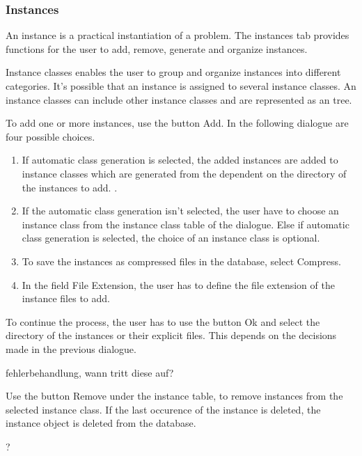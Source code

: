 \subsubsection{Instances}
 An instance is a practical instantiation of a problem. The instances tab provides functions for the user to add, remove, generate and organize instances.

 Instance classes enables the user to group and organize instances into different categories. It's possible that an instance is assigned to several instance classes. An instance classes can include other instance classes and are represented as an tree.

 To add one or more instances, use the button Add. In the following dialogue are four possible choices. 
\begin{enumerate}
	\item If automatic class generation is selected, the added instances are added to instance classes which
	are generated from the dependent on the directory of the instances to add. .
	
	\item If the automatic class generation isn't selected, the user have to choose an instance class from the 		instance class table of the dialogue. Else if automatic class generation is selected, the choice of an 			instance class is optional.
	
	\item To save the instances as compressed files in the database, select Compress.
	
	\item In the field File Extension, the user has to define the file extension of the instance files to add.
\end{enumerate}

To continue the process, the user has to use the button Ok and select the directory of the instances or their explicit files. This depends on the decisions made in the previous dialogue.

fehlerbehandlung, wann tritt diese auf?
 

 Use the button Remove under the instance table, to remove instances from the selected instance class. If the last occurence of the instance is deleted, the instance object is deleted from the database.

 ?

